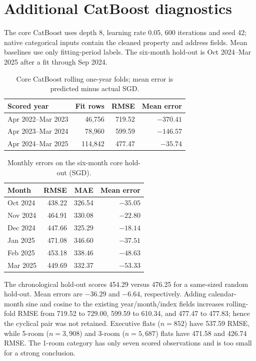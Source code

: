 \documentclass[10pt,a4paper]{article}
\begin{document}
\section{Additional CatBoost diagnostics}\label{app:coremodels}
The core CatBoost uses depth 8, learning rate 0.05, 600 iterations and seed 42; native categorical inputs contain the cleaned property and address fields. Mean baselines use only fitting-period labels. The six-month hold-out is Oct 2024--Mar 2025 after a fit through Sep 2024.
\begin{table}[htbp]\centering\small
\caption{Core CatBoost rolling one-year folds; mean error is predicted minus actual SGD.}\label{tab:rolling-short}
\begin{tabular}{lrrr}\toprule Scored year & Fit rows & RMSE & Mean error\\\midrule
Apr 2022--Mar 2023 & 46,756 & 719.52 & $-370.41$\\
Apr 2023--Mar 2024 & 78,960 & 599.59 & $-146.57$\\
Apr 2024--Mar 2025 & 114,842 & 477.47 & $-35.74$\\\bottomrule\end{tabular}\end{table}
\begin{table}[htbp]\centering\small
\caption{Monthly errors on the six-month core hold-out (SGD).}\label{tab:monthly-short}
\begin{tabular}{lrrr}\toprule Month & RMSE & MAE & Mean error\\\midrule
Oct 2024 & 438.22 & 326.54 & $-35.05$\\
Nov 2024 & 464.91 & 330.08 & $-22.80$\\
Dec 2024 & 447.66 & 325.29 & $-18.14$\\
Jan 2025 & 471.08 & 346.60 & $-37.51$\\
Feb 2025 & 453.18 & 338.46 & $-48.63$\\
Mar 2025 & 449.69 & 332.37 & $-53.33$\\\bottomrule\end{tabular}\end{table}
The chronological hold-out scores 454.29 versus 476.25 for a same-sized random hold-out. Mean errors are $-36.29$ and $-6.64$, respectively. Adding calendar-month sine and cosine to the existing year/month/index fields increases rolling-fold RMSE from 719.52 to 729.00, 599.59 to 610.34, and 477.47 to 477.83; hence the cyclical pair was not retained. Executive flats ($n=852$) have 537.59 RMSE, while 5-room ($n=3,908$) and 3-room ($n=5,687$) flats have 471.58 and 426.74 RMSE. The 1-room category has only seven scored observations and is too small for a strong conclusion.
\end{document}
